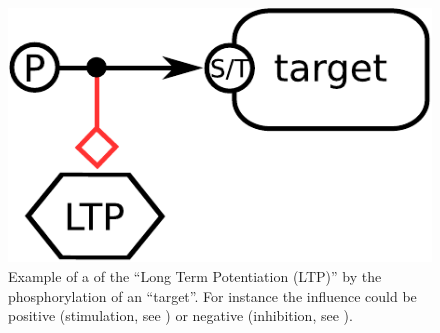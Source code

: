 \begin{figure}[H]
  \centering
  \includegraphics[scale = 0.5]{examples/ex-modulation}
  \caption{Example of a  of the  ``Long Term Potentiation (LTP)'' by the phosphorylation of an  ``target''. For instance the influence could be positive (stimulation, see ) or negative (inhibition, see ).}
  \label{fig:ex-modulation}
\end{figure}

\normalcolor

